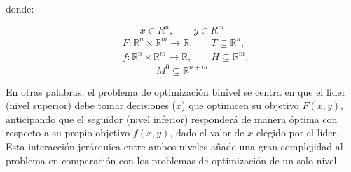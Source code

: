 \begin{samepage}
donde:

\begin{equation*}  
x \in R^{n}, \quad \quad y \in R^{m}
\end{equation*}
\begin{align*}
   & F : \mathbb{R}^{n} \times \mathbb{R}^{m} \to \mathbb{R}, 
   & \quad  T \subseteq \mathbb{R}^n ,
   \\
    & f : \mathbb{R}^{n} \times \mathbb{R}^{m} \to \mathbb{R} ,
    & \quad H \subseteq \mathbb{R}^m , 
\end{align*}
\begin{equation*}
    M^0 \subseteq \mathbb{R}^{n + m}
\end{equation*}
\end{samepage}
En otras palabras, el problema de optimización binivel se centra en que el líder (nivel superior) debe tomar decisiones ($x$) que optimicen su objetivo $F(x, y)$, anticipando que el seguidor (nivel inferior) responderá de manera óptima con respecto a su propio objetivo $f(x, y)$, dado el valor de $x$ elegido por el líder. Esta interacción jerárquica entre ambos niveles añade una gran complejidad al problema en comparación con los problemas de optimización de un solo nivel.

